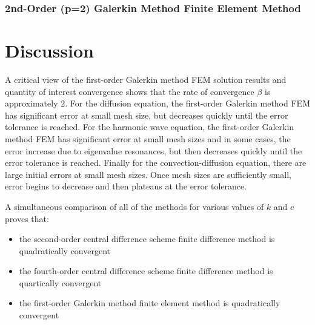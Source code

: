 \documentclass[10pt]{article}		%
\numberwithin{equation}{section}
\begin{document}
\newpage

\subsubsection{2nd-Order (p=2) Galerkin Method Finite Element Method}

%
%	

\newpage




\section{Discussion}

A critical view of the first-order Galerkin method FEM solution results and quantity of interest convergence shows that the rate of convergence $\beta$ is approximately 2. For the diffusion equation, the first-order Galerkin method FEM has significant error at small mesh size, but decreases quickly until the error tolerance is reached. For the harmonic wave equation, the first-order Galerkin method FEM has significant error at small mesh sizes and in some cases, the error increase due to eigenvalue resonances, but then decreases quickly until the error tolerance is reached. Finally for the convection-diffusion equation, there are large initial errors at small mesh sizes. Once mesh sizes are sufficiently small, error begins to decrease and then plateaus at the error tolerance.

A simultaneous comparison of all of the methods for various values of $k$ and $c$ proves that:

\begin{itemize}
	\item the second-order central difference scheme finite difference method is quadratically convergent
	\item the fourth-order central difference scheme finite difference method is quartically convergent
	\item the first-order Galerkin method finite element method is quadratically convergent
\end{itemize}
\end{document}
